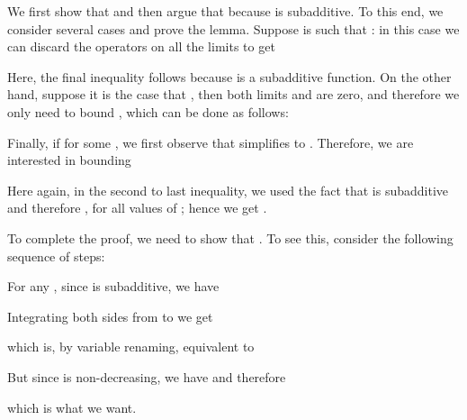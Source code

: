\documentclass[11pt]{article}
\newenvironment{proofof}[1]{\smallskip\noindent{\bf Proof of #1:}}{\hspace*{\fill}\par}
\begin{document}
\begin{proofof}{Lemma~\ref{lem:concave-arrival}}
We first show that
 and then argue that  because  is subadditive.
To this end, we consider several cases and prove the lemma.
Suppose  is such
that : in this case we can discard the
 operators on all the limits to get

Here, the final inequality follows because  is a subadditive function.
On the other hand, suppose it is the case that , then both limits  and  are zero, and therefore we only need to bound , which can be done as follows:

Finally, if  for some ,
we first observe that  simplifies to . Therefore, we are interested in bounding

Here again, in the second to last inequality, we used the fact that  is subadditive and therefore , for all values of ; hence we get .

\medskip \noindent To complete the proof, we need to show that . To see this, consider the following sequence of steps:

For any , since  is subadditive, we have

Integrating both sides from  to  we get

which is, by variable renaming, equivalent to

But since  is non-decreasing, we have  and therefore

which is what we want.
\end{proofof}
\end{document}
